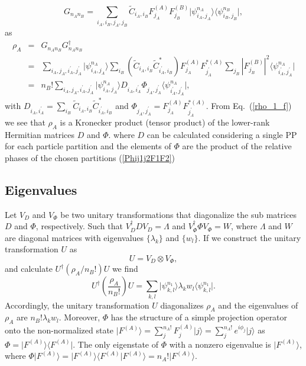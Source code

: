 \begin{equation}
G_{n_An_B}=\sum_{i_A,i_B,j_A,j_B}\tilde C_{i_A,i_B}F^{(A)}_{j_A}F^{(B)}_{j_B}\vert \psi^{n_A}_{i_A,j_A}\rangle\langle\psi^{n_B}_{i_B,j_B}\vert 
\label{C_1},
\end{equation}
%
as
%
\begin{eqnarray}
\rho_A &=& G_{n_An_B}G_{n_An_B}^\dagger\\ &=& \sum_{i^{}_A,j^{}_A,i^{\prime}_A,j^{\prime}_A}\vert \psi^{n_A}_{i^{}_A,j^{}_A}\rangle \sum_{i^{}_B}\left( \tilde C_{i^{}_A,i^{}_B}\tilde C^{*}_{i^{\prime}_A,i^{}_B}\right)F^{(A)}_{j^{}_A}{F}^{*(A)}_{j^{\prime}_A}\sum_{j^{}_B}\left\vert {F}^{(B)}_{j^{}_B}\right\vert ^2\langle\psi^{n_A}_{i^{\prime}_A,j^{\prime}_A}\vert \nonumber\\
 &=&n_B!\sum_{i^{}_A,j^{}_A,i^{\prime}_A,j^{\prime}_A}\vert \psi^{n_A}_{i^{}_A,j^{}_A}\rangle D_{i^{}_A,i^{\prime}_A}\Phi_{j^{}_A,j^{\prime}_A}\langle\psi^{n_A}_{i^{\prime}_A,j^{\prime}_A}\vert 
\label{rho_1_f},
\end{eqnarray}
%
with $D_{i^{}_A,i^{\prime}_A}= \sum_{i^{}_B} \tilde C_{i^{}_A,i^{}_B}\tilde
C^*_{i^{\prime}_A,i^{}_B}$ and
$\Phi_{j^{}_A,j^{\prime}_A}=F^{(A)}_{j^{}_A}{F}^{*(A)}_{j^{\prime}_A}$.  From
Eq.~(\ref{rho_1_f}) we see that $\rho_A$ is a Kronecker product (tensor
product) of the lower-rank Hermitian matrices $D$ and $\Phi$.  where $D$ can be
calculated considering a single PP for each particle partition and the
elements of $\Phi$ are the product of the relative phases of the chosen
partitions (\ref{Phij1j2F1F2}) 

\subsection{Eigenvalues}
\label{sec:Eigenvalues}

Let $V_D$ and $V_{\Phi}$ be two unitary transformations that diagonalize the
sub matrices $D$ and $\Phi$, respectively. Such that
$V^{\dagger}_DDV^{}_D=\Lambda$ and $V^{\dagger}_{\Phi}\Phi V^{}_{\Phi}=W$,
where $\Lambda$  and $W$ are diagonal matrices with eigenvalues $\{\lambda_k\}$
and $\{w_l\}$.  If we construct the unitary transformation $U$ as
%
\begin{equation}
U=V_D \otimes V_{\Phi}
\label{U},
\end{equation}
%
and calculate $U^\dagger(\rho_A/n_B!)U$ we find
%
\begin{equation}
    U^\dagger\left(\frac{\rho_A}{n_B!}\right)U=\sum_{k,l}\vert \psi^{n_1}_{k,l}\rangle \lambda_k w_l\langle\psi^{n_1}_{k,l}\vert 
\label{UdrhoU}.
\end{equation}
%
Accordingly, the unitary transformation $U$ diagonalizes $\rho_A$ and the
eigenvalues of $\rho_A$ are $n_B!\lambda_k w_l$. Moreover, $\Phi$ has the
structure of a simple projection operator onto the non-normalized state $\vert
F^{(A)}\rangle=\sum_j^{n_A!} F^{(A)}_j\vert j\rangle=\sum_j^{n_A!}
e^{i\phi_j}\vert j\rangle$ as $\Phi=\vert F^{(A)}\rangle\langle F^{(A)}\vert$.
The only eigenstate of $\Phi$ with a nonzero eigenvalue is $\vert
F^{(A)}\rangle$, where $\Phi\vert F^{(A)}\rangle=\vert F^{(A)}\rangle\langle
F^{(A)}\vert F^{(A)}\rangle=n_A!\vert F^{(A)}\rangle$. 


